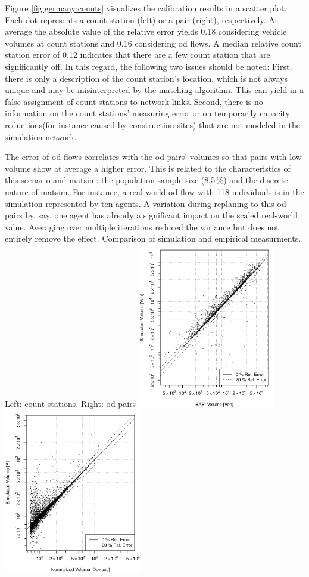 Figure \ref{fig:germany:counts} visualizes the calibration results in a scatter plot. Each dot represents a count station (left) or a  pair (right), respectively. At average the absolute value of the relative error yields 0.18 considering vehicle volumes at count stations and 0.16 considering \gls{od} flows. A median relative count station error of 0.12 indicates that there are a few count station that are significantly off. In this regard, the following two issues should be noted: First, there is only a description of the count station's location, which is not always unique and may be misinterpreted by the matching algorithm. This can yield in a false assignment of count stations to network links. Second, there is no information on the count stations' measuring error or on temporarily capacity reductions(for instance caused by construction sites) that are not modeled in the simulation network.

The error of \gls{od} flows correlates with the \gls{od} pairs' volumes so that pairs with low volume show at average a higher error. This is related to the characteristics of this scenario and \gls{matsim}: the population sample size (8.5\,\%) and the discrete nature of \gls{matsim}. For instance, a real-world \gls{od} flow with 118 individuals is in the simulation represented by ten agents. A variation during replaning to this \gls{od} pairs by, say, one agent has already a significant impact on the scaled real-world value. Averaging over multiple iterations reduced the variance but does not entirely remove the effect.
\createfigure%
{}%
{Comparison of simulation and empirical measurments. Left: count stations. Right: \gls{od} pairs}%
{\label{fig:germany:counts}}%
{\includegraphics[width=0.45\textwidth, angle=0]{./scenarios/figures/germany-counts}\includegraphics[width=0.45\textwidth, angle=0]{./scenarios/figures/germany-odcounts}}%
{}




